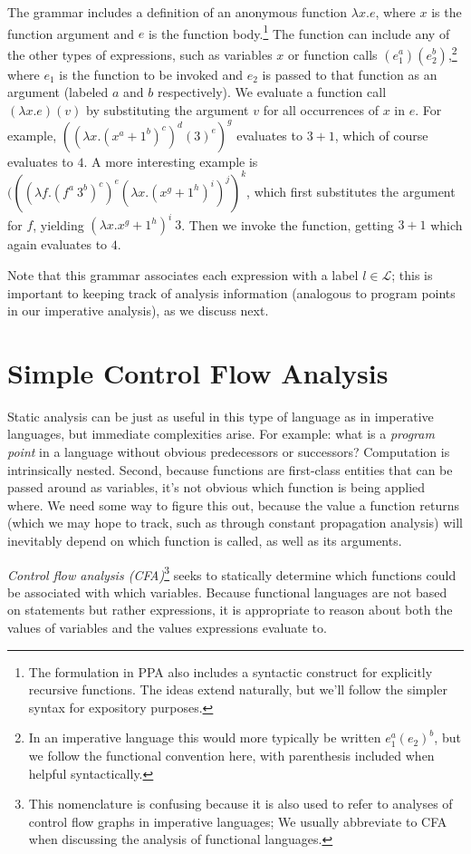 \documentclass[11pt]{article}
\begin{document}
The grammar includes a definition of an anonymous function $\lambda x . e$,
where $x$ is the function argument and $e$ is the function body.\footnote{The
  formulation in PPA also includes a syntactic construct for explicitly
  recursive functions. The ideas extend naturally, but we'll follow the simpler
  syntax for expository purposes.} The function can include any of the other
types of expressions, such as variables $x$ or function calls $(e_1^a) (e_2^b)$,\footnote{In an imperative language this would more typically be written
$e_1^a(e_2)^b$, but we follow the functional convention here, with parenthesis
included when helpful syntactically.}
where $e_1$ is the function to be invoked and $e_2$ is passed to that function
as an argument (labeled  $a$ and $b$ respectively).  We evaluate a function call
$(\lambda x . e)(v)$ by substituting the argument $v$ for all occurrences of $x$
in $e$. For example, $((\lambda x . (x^a + 1^b)^c)^d (3)^e)^g$ evaluates to $3 + 1$, which of
course evaluates to $4$.
%
A more interesting example is  $(((\lambda f . (f^a ~ 3^b)^c)^e (\lambda x .
(x^g + 1^h)^i)^j)^k$, which first substitutes the argument 
for $f$, yielding $(\lambda x . x^g + 1^h)^i ~ 3$. Then we invoke the function,
getting $3+1$ which again evaluates to $4$.

Note that this grammar associates each expression with a label
$l \in \mathcal{L}$; this is important to keeping track of analysis information
(analogous to program points in our imperative analysis), as we discuss next.

\section{Simple Control Flow Analysis} 

Static analysis can be just as useful in this type of language as in imperative
languages, but immediate complexities arise. For example: what is a
\emph{program point} in a language without obvious predecessors or successors?
Computation is intrinsically nested. 
%
Second, because functions are first-class entities that can be passed around as
variables, it's not obvious which function is being applied where. We need some
way to figure this out, because the value a function returns (which we may hope
to track, such as through constant propagation analysis) will inevitably depend
on which function is called, as well as its arguments.

\emph{Control flow analysis (CFA)}\footnote{This nomenclature is confusing because it
  is also used to refer to analyses of control flow graphs in imperative
  languages; We usually abbreviate to CFA when discussing the analysis of
  functional languages.} seeks to statically determine which functions could be
associated with which variables. Because functional languages are not based on
statements but rather expressions, it is appropriate to reason about both the
values of variables and the values expressions evaluate to.
\end{document}
